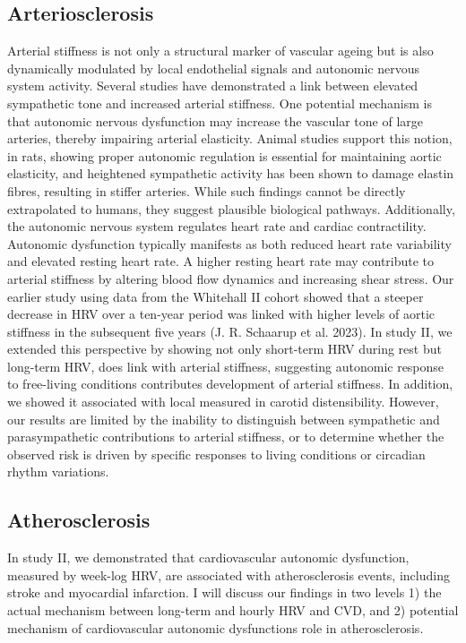 \documentclass[
  a4paper,
  headsepline=true,
  open=any]{scrbook}
\begin{document}
\hypertarget{arteriosclerosis-1}{%
\subsection{Arteriosclerosis}\label{arteriosclerosis-1}}

Arterial stiffness is not only a structural marker of vascular ageing
but is also dynamically modulated by local endothelial signals and
autonomic nervous system activity. Several studies have demonstrated a
link between elevated sympathetic tone and increased arterial stiffness.
One potential mechanism is that autonomic nervous dysfunction may
increase the vascular tone of large arteries, thereby impairing arterial
elasticity. Animal studies support this notion, in rats, showing proper
autonomic regulation is essential for maintaining aortic elasticity, and
heightened sympathetic activity has been shown to damage elastin fibres,
resulting in stiffer arteries. While such findings cannot be directly
extrapolated to humans, they suggest plausible biological pathways.
Additionally, the autonomic nervous system regulates heart rate and
cardiac contractility. Autonomic dysfunction typically manifests as both
reduced heart rate variability and elevated resting heart rate. A higher
resting heart rate may contribute to arterial stiffness by altering
blood flow dynamics and increasing shear stress. Our earlier study using
data from the Whitehall II cohort showed that a steeper decrease in HRV
over a ten-year period was linked with higher levels of aortic stiffness
in the subsequent five years (J. R. Schaarup et al. 2023). In study II,
we extended this perspective by showing not only short-term HRV during
rest but long-term HRV, does link with arterial stiffness, suggesting
autonomic response to free-living conditions contributes development of
arterial stiffness. In addition, we showed it associated with local
measured in carotid distensibility. However, our results are limited by
the inability to distinguish between sympathetic and parasympathetic
contributions to arterial stiffness, or to determine whether the
observed risk is driven by specific responses to living conditions or
circadian rhythm variations.

\hypertarget{atherosclerosis-1}{%
\subsection{Atherosclerosis}\label{atherosclerosis-1}}

In study II, we demonstrated that cardiovascular autonomic dysfunction,
measured by week-log HRV, are associated with atherosclerosis events,
including stroke and myocardial infarction. I will discuss our findings
in two levels 1) the actual mechanism between long-term and hourly HRV
and CVD, and 2) potential mechanism of cardiovascular autonomic
dysfunctions role in atherosclerosis.
\end{document}
